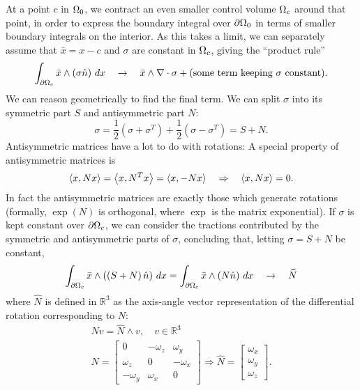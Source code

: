 At a point $c$ in ${\Omega_0}$, we contract an even smaller control volume ${\Omega}_c$ around that point, in order to express
the boundary integral over ${\partial\Omega_0}$ in terms of smaller boundary integrals on the interior. As this takes a limit,
we can separately assume that $\bar{x} = x - c$ and $\sigma$ are constant in ${\Omega}_c$, giving the ``product rule''
\begin{align*}
    \int_{{\partial\Omega}_c} \bar{x}\wedge\left(\sigma\hat{n}\right)\,dx \quad\rightarrow\quad
    \bar{x}\wedge \nabla\cdot \sigma + \text{(some term keeping $\sigma$ constant)}.
\end{align*}
We can reason geometrically to find the final term. We can split $\sigma$ into its symmetric part $S$ and antisymmetric part $N$:
    $$\sigma = \frac{1}{2}\left(\sigma + \sigma^T\right) + \frac{1}{2}\left(\sigma - \sigma^T\right) = S + N.$$
Antisymmetric matrices have a lot to do with rotations: A special property of antisymmetric matrices is
    $$\left<x, Nx\right> = \left<x, N^Tx\right> = \left<x, -Nx\right> \quad\Rightarrow\quad \left<x, Nx\right> = 0.$$
In fact the antisymmetric matrices are exactly those which generate rotations (formally, $\exp(N)$ is orthogonal, where $\exp$ is the matrix
exponential). If $\sigma$ is kept constant over ${\partial\Omega}_c$, we can consider the tractions contributed by the symmetric and antisymmetric parts of $\sigma$,
concluding that, letting $\sigma = S + N$ be constant,
\begin{align*}
    \int_{{\partial\Omega}_c} \bar{x} \wedge \left(\left(S + N\right)\hat{n}\right)\,dx
    =
    \int_{{\partial\Omega}_c} \bar{x} \wedge \left(N\hat{n}\right)\,dx
    \quad\rightarrow\quad
    \widehat{N}
\end{align*}
where $\widehat{N}$ is defined in $\mathbb{R}^3$ as the axis-angle vector representation of the differential rotation corresponding to $N$:
\begin{equation}
\begin{split}
    Nv = \widehat{N}\wedge v,\quad v\in\mathbb{R}^3
    \\
    N = \begin{bmatrix}
        0 & -\omega_z & \omega_y \\ \omega_z & 0 & -\omega_x  \\ -\omega_y & \omega_x & 0
    \end{bmatrix} \Rightarrow \widehat{N} = \begin{bmatrix} \omega_x \\ \omega_y \\ \omega_z \end{bmatrix}.
\end{split}
\end{equation}
